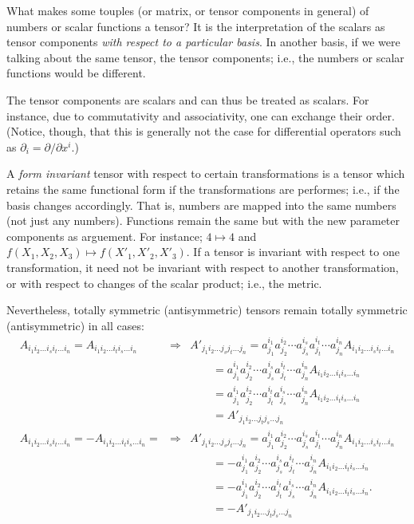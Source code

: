 What makes some touples (or matrix, or tensor components in general)  of
numbers or scalar functions a tensor? It is the
interpretation of the scalars as tensor components {\em with respect to
a particular basis}. In another basis, if we were talking about the same
tensor, the tensor components; i.e., the numbers or scalar functions
would be different.

The tensor components are scalars and can thus be treated as scalars.
For instance, due to commutativity and associativity, one can exchange
their order. (Notice, though, that this is generally not the case for
differential operators such as $\partial_i=\partial / \partial x^i$.)

A {\em form invariant} tensor with respect to  certain transformations
is a tensor which retains
the same functional form if the transformations are performes; i.e.,
if the basis changes accordingly.
That is, numbers are mapped into the same numbers (not just any
numbers).
Functions remain the same but with the new parameter components as
arguement. For instance; $4\mapsto 4$ and $f(X_1,X_2,X_3)\mapsto
f(X'_1,X'_2,X'_3)$.
If a tensor is invariant with respect to one transformation, it need not
be invariant with respect to another transformation, or with respect to
changes of the scalar product; i.e., the metric.

Nevertheless, totally symmetric (antisymmetric) tensors remain totally
symmetric (antisymmetric) in all cases:
\begin{eqnarray}
A_{i_1i_2 \ldots i_si_t\ldots i_n}
=
A_{i_1i_2 \ldots i_ti_s\ldots i_n}
&\Longrightarrow&
A'_{j_1i_2 \ldots j_s j_t\ldots j_n}
=
a_{j_1}^{i_1}a_{j_2}^{i_2}\cdots
a_{j_s}^{i_s}a_{j_t}^{i_t}\cdots
a_{j_n}^{i_n} A_{i_1 i_2\ldots i_s i_t\ldots  i_n}
\nonumber \\ &&\qquad
=
a_{j_1}^{i_1}a_{j_2}^{i_2}\cdots
a_{j_s}^{i_s}a_{j_t}^{i_t}\cdots
a_{j_n}^{i_n} A_{i_1 i_2\ldots i_t i_s\ldots  i_n}
\nonumber \\ &&\qquad
=
a_{j_1}^{i_1}a_{j_2}^{i_2}\cdots
a_{j_t}^{i_t}a_{j_s}^{i_s}\cdots
a_{j_n}^{i_n} A_{i_1 i_2\ldots i_t i_s\ldots  i_n}
\nonumber \\ &&\qquad
=
A'_{j_1i_2 \ldots j_t j_s\ldots j_n}
\\
A_{i_1i_2 \ldots i_si_t\ldots i_n}
=
-A_{i_1i_2 \ldots i_ti_s\ldots i_n}
=
&\Longrightarrow&
A'_{j_1i_2 \ldots j_s j_t\ldots j_n}
=
a_{j_1}^{i_1}a_{j_2}^{i_2}\cdots
a_{j_s}^{i_s}a_{j_t}^{i_t}\cdots
a_{j_n}^{i_n} A_{i_1 i_2\ldots i_s i_t\ldots  i_n}
\nonumber \\ &&\qquad
=
-a_{j_1}^{i_1}a_{j_2}^{i_2}\cdots
a_{j_s}^{i_s}a_{j_t}^{i_t}\cdots
a_{j_n}^{i_n} A_{i_1 i_2\ldots i_t i_s\ldots  i_n}
\nonumber \\ &&\qquad
=
-a_{j_1}^{i_1}a_{j_2}^{i_2}\cdots
a_{j_t}^{i_t}a_{j_s}^{i_s}\cdots
a_{j_n}^{i_n} A_{i_1 i_2\ldots i_t i_s\ldots  i_n}.
\nonumber \\ &&\qquad
=
-A'_{j_1i_2 \ldots j_t j_s\ldots j_n}
\end{eqnarray}


